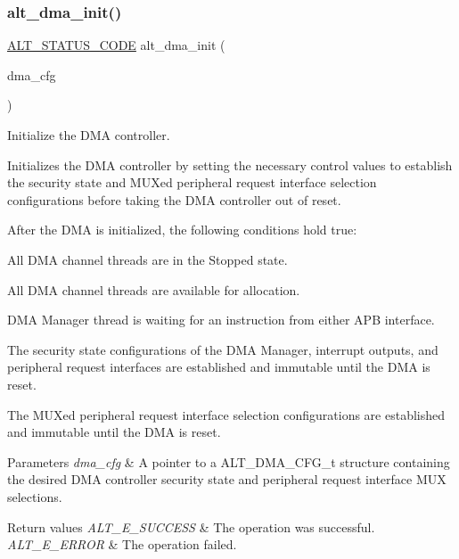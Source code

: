 \subsubsection{\texorpdfstring{alt\_dma\_init()}{alt\_dma\_init()}}
{\footnotesize\ttfamily \mbox{\hyperlink{hwlib_8h_abdb0d369f069723ca55d6c94bcaaaa12}{A\+L\+T\+\_\+\+S\+T\+A\+T\+U\+S\+\_\+\+C\+O\+DE}} alt\+\_\+dma\+\_\+init (\begin{DoxyParamCaption}\item[{const \mbox{\hyperlink{group__ALT__DMA__CSR_ga45eeb28a3a41b762727db85583888f34}{A\+L\+T\+\_\+\+D\+M\+A\+\_\+\+C\+F\+G\+\_\+t}} $\ast$}]{dma\+\_\+cfg }\end{DoxyParamCaption})}

Initialize the D\+MA controller.

Initializes the D\+MA controller by setting the necessary control values to establish the security state and M\+U\+Xed peripheral request interface selection configurations before taking the D\+MA controller out of reset.

After the D\+MA is initialized, the following conditions hold true\+:
\begin{DoxyItemize}
\item All D\+MA channel threads are in the Stopped state.
\item All D\+MA channel threads are available for allocation.
\item D\+MA Manager thread is waiting for an instruction from either A\+PB interface.
\item The security state configurations of the D\+MA Manager, interrupt outputs, and peripheral request interfaces are established and immutable until the D\+MA is reset.
\item The M\+U\+Xed peripheral request interface selection configurations are established and immutable until the D\+MA is reset.
\end{DoxyItemize}


\begin{DoxyParams}{Parameters}
{\em dma\+\_\+cfg} & A pointer to a A\+L\+T\+\_\+\+D\+M\+A\+\_\+\+C\+F\+G\+\_\+t structure containing the desired D\+MA controller security state and peripheral request interface M\+UX selections.\\
\hline
\end{DoxyParams}

\begin{DoxyRetVals}{Return values}
{\em A\+L\+T\+\_\+\+E\+\_\+\+S\+U\+C\+C\+E\+SS} & The operation was successful. \\
\hline
{\em A\+L\+T\+\_\+\+E\+\_\+\+E\+R\+R\+OR} & The operation failed. \\
\hline
\end{DoxyRetVals}
\mbox{\label{group__ALT__DMA__CSR_gaf26e4ade293e06f6a18afb914d3e2e02}} 
